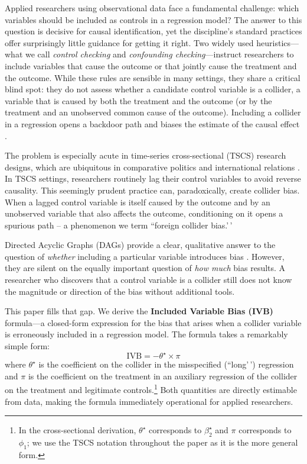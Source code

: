 \documentclass[
]{article}
\begin{document}
Applied researchers using observational data face a fundamental
challenge: which variables should be included as controls in a
regression model? The answer to this question is decisive for causal
identification, yet the discipline's standard practices offer
surprisingly little guidance for getting it right. Two widely used
heuristics---what we call \emph{control checking} and \emph{confounding
checking}---instruct researchers to include variables that cause the
outcome or that jointly cause the treatment and the outcome. While these
rules are sensible in many settings, they share a critical blind spot:
they do not assess whether a candidate control variable is a collider, a
variable that is caused by both the treatment and the outcome (or by the
treatment and an unobserved common cause of the outcome). Including a
collider in a regression opens a backdoor path and biases the estimate
of the causal effect \citep{pearl2009causality, elwert2014endogenous}.

The problem is especially acute in time-series cross-sectional (TSCS)
research designs, which are ubiquitous in comparative politics and
international relations \citep{beck1995what}. In TSCS settings,
researchers routinely lag their control variables to avoid reverse
causality. This seemingly prudent practice can, paradoxically, create
collider bias. When a lagged control variable is itself caused by the
outcome and by an unobserved variable that also affects the outcome,
conditioning on it opens a spurious path -- a phenomenon we term
``foreign collider bias.'\,'

Directed Acyclic Graphs (DAGs) provide a clear, qualitative answer to
the question of \emph{whether} including a particular variable
introduces bias
\citep{pearl2009causality, imbens2020potential, montgomery2018conditioning, blackwell2018make}.
However, they are silent on the equally important question of \emph{how
much} bias results. A researcher who discovers that a control variable
is a collider still does not know the magnitude or direction of the bias
without additional tools.

This paper fills that gap. We derive the \textbf{Included Variable Bias
(IVB)} formula---a closed-form expression for the bias that arises when
a collider variable is erroneously included in a regression model. The
formula takes a remarkably simple form: \begin{equation}
\text{IVB} = -\theta^{\star} \times \pi
\label{eq:ivb_main}
\end{equation} where \(\theta^{\star}\) is the coefficient on the
collider in the misspecified (``long'\,') regression and \(\pi\) is the
coefficient on the treatment in an auxiliary regression of the collider
on the treatment and legitimate controls.\footnote{In the
  cross-sectional derivation, \(\theta^{\star}\) corresponds to
  \(\beta_2^{\star}\) and \(\pi\) corresponds to \(\phi_1\); we use the
  TSCS notation throughout the paper as it is the more general form.}
Both quantities are directly estimable from data, making the formula
immediately operational for applied researchers.
\end{document}
